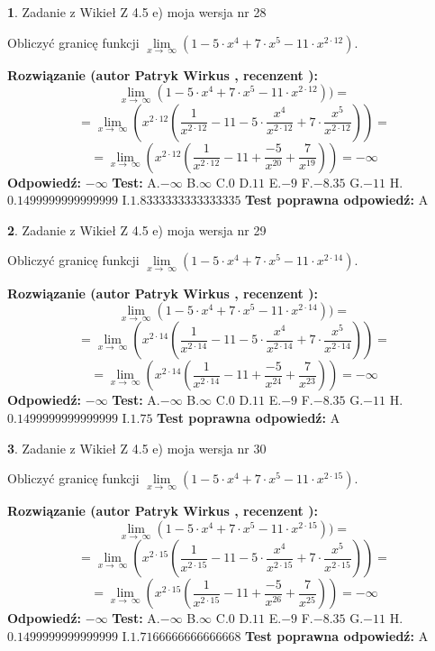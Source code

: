 \documentclass[12pt, a4paper]{article}
\theoremstyle{definition} %
\newtheorem{zad}{}
\newcommand{\zadStart}[1]{\begin{zad}#1\newline}
\newcommand{\zadStop}{\end{zad}}
\newcommand{\rozwStart}[2]{\noindent \textbf{Rozwiązanie (autor #1 , recenzent #2): }\newline}
\newcommand{\rozwStop}{\newline}
\newcommand{\odpStart}{\noindent \textbf{Odpowiedź:}\newline}
\newcommand{\odpStop}{\newline}
\newcommand{\testStart}{\noindent \textbf{Test:}\newline}
\newcommand{\testStop}{\newline}
\newcommand{\kluczStart}{\noindent \textbf{Test poprawna odpowiedź:}\newline}
\newcommand{\kluczStop}{\newline}
\begin{document}
\zadStart{Zadanie z Wikieł Z 4.5 e) moja wersja nr 28}


Obliczyć granicę funkcji  $\lim\limits_{x\to\ \infty}(1 - 5 \cdot x^{4}+7 \cdot x^{5}- 11 \cdot x^{2\cdot12})$.
\zadStop
\rozwStart{Patryk Wirkus}{}
$$\lim\limits_{x\to\ \infty}(1 - 5 \cdot x^{4}+7 \cdot x^{5}- 11 \cdot x^{2\cdot12}))=$$
$$=\lim\limits_{x\to\ \infty}(x^{2\cdot12}(\frac{1}{x^{2\cdot12}}-11 -5 \cdot \frac{x^{4}}{x^{2\cdot12}}+7 \cdot \frac{x^{5}}{x^{2\cdot12}}))=$$
$$=\lim\limits_{x\to\ \infty}(x^{2\cdot12}(\frac{1}{x^{2\cdot12}}-11 + \frac{-5}{x^{20}}+ \frac{7}{x^{19}}))=-\infty$$
\rozwStop
\odpStart
$-\infty$
\odpStop
\testStart
A.$-\infty$ B.$\infty$ C.$0$ D.$11$ E.$-9$
F.$-8.35$ G.$-11$
H.$0.1499999999999999$
I.$1.8333333333333335$
\testStop
\kluczStart
A
\kluczStop



\zadStart{Zadanie z Wikieł Z 4.5 e) moja wersja nr 29}


Obliczyć granicę funkcji  $\lim\limits_{x\to\ \infty}(1 - 5 \cdot x^{4}+7 \cdot x^{5}- 11 \cdot x^{2\cdot14})$.
\zadStop
\rozwStart{Patryk Wirkus}{}
$$\lim\limits_{x\to\ \infty}(1 - 5 \cdot x^{4}+7 \cdot x^{5}- 11 \cdot x^{2\cdot14}))=$$
$$=\lim\limits_{x\to\ \infty}(x^{2\cdot14}(\frac{1}{x^{2\cdot14}}-11 -5 \cdot \frac{x^{4}}{x^{2\cdot14}}+7 \cdot \frac{x^{5}}{x^{2\cdot14}}))=$$
$$=\lim\limits_{x\to\ \infty}(x^{2\cdot14}(\frac{1}{x^{2\cdot14}}-11 + \frac{-5}{x^{24}}+ \frac{7}{x^{23}}))=-\infty$$
\rozwStop
\odpStart
$-\infty$
\odpStop
\testStart
A.$-\infty$ B.$\infty$ C.$0$ D.$11$ E.$-9$
F.$-8.35$ G.$-11$
H.$0.1499999999999999$
I.$1.75$
\testStop
\kluczStart
A
\kluczStop



\zadStart{Zadanie z Wikieł Z 4.5 e) moja wersja nr 30}


Obliczyć granicę funkcji  $\lim\limits_{x\to\ \infty}(1 - 5 \cdot x^{4}+7 \cdot x^{5}- 11 \cdot x^{2\cdot15})$.
\zadStop
\rozwStart{Patryk Wirkus}{}
$$\lim\limits_{x\to\ \infty}(1 - 5 \cdot x^{4}+7 \cdot x^{5}- 11 \cdot x^{2\cdot15}))=$$
$$=\lim\limits_{x\to\ \infty}(x^{2\cdot15}(\frac{1}{x^{2\cdot15}}-11 -5 \cdot \frac{x^{4}}{x^{2\cdot15}}+7 \cdot \frac{x^{5}}{x^{2\cdot15}}))=$$
$$=\lim\limits_{x\to\ \infty}(x^{2\cdot15}(\frac{1}{x^{2\cdot15}}-11 + \frac{-5}{x^{26}}+ \frac{7}{x^{25}}))=-\infty$$
\rozwStop
\odpStart
$-\infty$
\odpStop
\testStart
A.$-\infty$ B.$\infty$ C.$0$ D.$11$ E.$-9$
F.$-8.35$ G.$-11$
H.$0.1499999999999999$
I.$1.7166666666666668$
\testStop
\kluczStart
A
\kluczStop
\end{document}
